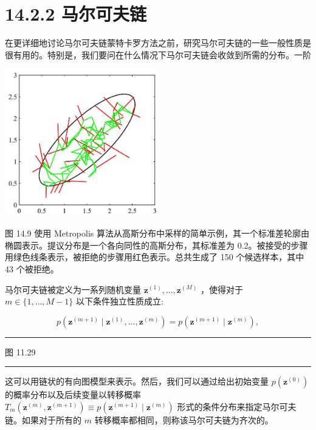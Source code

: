 \documentclass[10pt]{article}
\newcommand{\HRule}{\begin{center}\rule{0.9\linewidth}{0.2mm}\end{center}}
\begin{document}
\section*{14.2.2 马尔可夫链}

在更详细地讨论马尔可夫链蒙特卡罗方法之前，研究马尔可夫链的一些一般性质是很有用的。特别是，我们要问在什么情况下马尔可夫链会收敛到所需的分布。一阶

\begin{center}
\includegraphics[max width=0.5\textwidth]{images/0194e279-9b28-703a-88f4-c3ac21e2010d_462_923_365_621_597_0.jpg}
\end{center}
\hspace*{3em} 

图 14.9 使用 Metropolis 算法从高斯分布中采样的简单示例，其一个标准差轮廓由椭圆表示。提议分布是一个各向同性的高斯分布，其标准差为 0.2。被接受的步骤用绿色线条表示，被拒绝的步骤用红色表示。总共生成了 150 个候选样本，其中 43 个被拒绝。

马尔可夫链被定义为一系列随机变量 \({\mathbf{z}}^{\left( 1\right) },\ldots ,{\mathbf{z}}^{\left( M\right) }\) ，使得对于 \(m \in  \{ 1,\ldots ,M - 1\}\) 以下条件独立性质成立:

\[
p\left( {{\mathbf{z}}^{\left( m + 1\right) } \mid  {\mathbf{z}}^{\left( 1\right) },\ldots ,{\mathbf{z}}^{\left( m\right) }}\right)  = p\left( {{\mathbf{z}}^{\left( m + 1\right) } \mid  {\mathbf{z}}^{\left( m\right) }}\right) , \tag{14.31}
\]

\HRule

图 11.29

\HRule

这可以用链状的有向图模型来表示。然后，我们可以通过给出初始变量 \(p\left( {\mathbf{z}}^{\left( 0\right) }\right)\) 的概率分布以及后续变量以转移概率 \({T}_{m}\left( {{\mathbf{z}}^{\left( m\right) },{\mathbf{z}}^{\left( m + 1\right) }}\right)  \equiv  p\left( {{\mathbf{z}}^{\left( m + 1\right) } \mid  {\mathbf{z}}^{\left( m\right) }}\right)\) 形式的条件分布来指定马尔可夫链。如果对于所有的 \(m\) 转移概率都相同，则称该马尔可夫链为齐次的。
\end{document}
